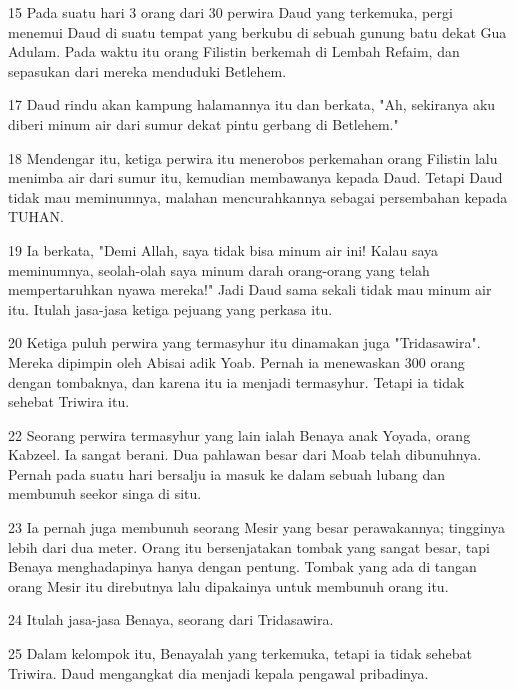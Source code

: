 \par 15 Pada suatu hari 3 orang dari 30 perwira Daud yang terkemuka, pergi menemui Daud di suatu tempat yang berkubu di sebuah gunung batu dekat Gua Adulam. Pada waktu itu orang Filistin berkemah di Lembah Refaim, dan sepasukan dari mereka menduduki Betlehem.
\par 17 Daud rindu akan kampung halamannya itu dan berkata, "Ah, sekiranya aku diberi minum air dari sumur dekat pintu gerbang di Betlehem."
\par 18 Mendengar itu, ketiga perwira itu menerobos perkemahan orang Filistin lalu menimba air dari sumur itu, kemudian membawanya kepada Daud. Tetapi Daud tidak mau meminumnya, malahan mencurahkannya sebagai persembahan kepada TUHAN.
\par 19 Ia berkata, "Demi Allah, saya tidak bisa minum air ini! Kalau saya meminumnya, seolah-olah saya minum darah orang-orang yang telah mempertaruhkan nyawa mereka!" Jadi Daud sama sekali tidak mau minum air itu. Itulah jasa-jasa ketiga pejuang yang perkasa itu.
\par 20 Ketiga puluh perwira yang termasyhur itu dinamakan juga "Tridasawira". Mereka dipimpin oleh Abisai adik Yoab. Pernah ia menewaskan 300 orang dengan tombaknya, dan karena itu ia menjadi termasyhur. Tetapi ia tidak sehebat Triwira itu.
\par 22 Seorang perwira termasyhur yang lain ialah Benaya anak Yoyada, orang Kabzeel. Ia sangat berani. Dua pahlawan besar dari Moab telah dibunuhnya. Pernah pada suatu hari bersalju ia masuk ke dalam sebuah lubang dan membunuh seekor singa di situ.
\par 23 Ia pernah juga membunuh seorang Mesir yang besar perawakannya; tingginya lebih dari dua meter. Orang itu bersenjatakan tombak yang sangat besar, tapi Benaya menghadapinya hanya dengan pentung. Tombak yang ada di tangan orang Mesir itu direbutnya lalu dipakainya untuk membunuh orang itu.
\par 24 Itulah jasa-jasa Benaya, seorang dari Tridasawira.
\par 25 Dalam kelompok itu, Benayalah yang terkemuka, tetapi ia tidak sehebat Triwira. Daud mengangkat dia menjadi kepala pengawal pribadinya.
